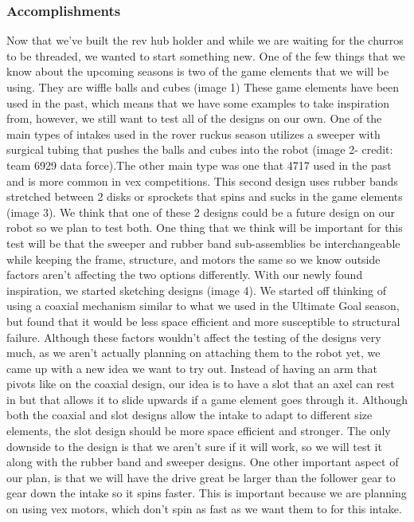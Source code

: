 \subsubsection*{Accomplishments}
Now that we’ve built the rev hub holder and while we are waiting for the churros to be threaded, we wanted to start something new. One of the few things that we know about the upcoming seasons is two of the game elements that we will be using. They are wiffle balls and cubes (image 1) These game elements have been used in the past, which means that we have some examples to take inspiration from, however, we still want to test all of the designs on our own. One of the main types of intakes used in the rover ruckus season utilizes a sweeper with surgical tubing that pushes the balls and cubes into the robot (image 2- credit: team 6929 data force).The other main type was one that 4717 used in the past and is more common in vex competitions. This second design uses rubber bands stretched between 2 disks or sprockets that spins and sucks in the game elements (image 3). We think that one of these 2 designs could be a future design on our robot so we plan to test both. One thing that we think will be important for this test will be that the sweeper and rubber band sub-assemblies be interchangeable while keeping the frame, structure, and motors the same so we know outside factors aren’t affecting the two options differently.
With our newly found inspiration, we started sketching designs (image 4). We started off thinking of using a coaxial mechanism similar to what we used in the Ultimate Goal season, but found that it would be less space efficient and more susceptible to structural failure. Although these factors wouldn’t affect the testing of the designs very much, as we aren't actually planning on attaching them to the robot yet, we came up with a new idea we want to try out. Instead of having an arm that pivots like on the coaxial design, our idea is to have a slot that an axel can rest in but that allows it to slide upwards if a game element goes through it. Although both the coaxial and slot designs allow the intake to adapt to different size elements, the slot design should be more space efficient and stronger. The only downside to the design is that we aren't sure if it will work, so we will test it along with the rubber band and sweeper designs. One other important aspect of our plan, is that we will have the drive great be larger than the follower gear to gear down the intake so it spins faster. This is important because we are planning on using vex motors, which don’t spin as fast as we want them to for this intake.
